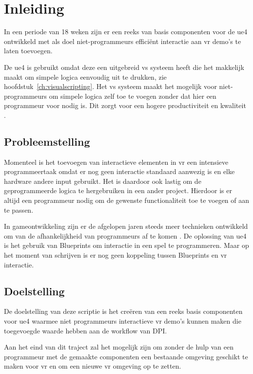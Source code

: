\chapter{Inleiding}

In een periode van 18 weken zijn er een reeks van basis componenten voor de \gls{ue4} ontwikkeld met als doel niet-programmeurs efficiënt interactie aan \gls{vr} demo’s te laten toevoegen.

De \gls{ue4} is gebruikt omdat deze een uitgebreid \gls{vs} systeem heeft die het makkelijk maakt om simpele logica eenvoudig uit te drukken, zie hoofdstuk~\ref{ch:visualscripting}. Het \gls{vs} systeem maakt het mogelijk voor niet-programmeurs om simpele logica zelf toe te voegen zonder dat hier een programmeur voor nodig is. Dit zorgt voor een hogere productiviteit en kwaliteit \cite{Cutumisu200732}.

\section{Probleemstelling}

Momenteel is het toevoegen van interactieve elementen in \gls{vr} een intensieve programmeertaak omdat er nog geen interactie standaard aanwezig is en elke hardware andere input gebruikt. Het is daardoor ook lastig om de geprogrammeerde logica te hergebruiken in een ander project. Hierdoor is er altijd een programmeur nodig om de gewenste functionaliteit toe te voegen of aan te passen. 

In gameontwikkeling zijn er de afgelopen jaren steeds meer technieken ontwikkeld om van de afhankelijkheid van programmeurs af te komen \cite{Cutumisu200732, ambientbehav}. De oplossing van \gls{ue4} is het gebruik van Blueprints om interactie in een spel te programmeren. Maar op het moment van schrijven is er nog geen koppeling tussen Blueprints en \gls{vr} interactie.

\section{Doelstelling}

De doelstelling van deze scriptie is het creëren van een reeks basis componenten voor \gls{ue4} waarmee niet programmeurs interactieve \gls{vr} demo’s kunnen maken die toegevoegde waarde hebben aan de workflow van DPI.

Aan het eind van dit traject zal het mogelijk zijn om zonder de hulp van een programmeur met de gemaakte componenten een bestaande omgeving geschikt te maken voor \gls{vr} en om een nieuwe \gls{vr} omgeving op te zetten.


